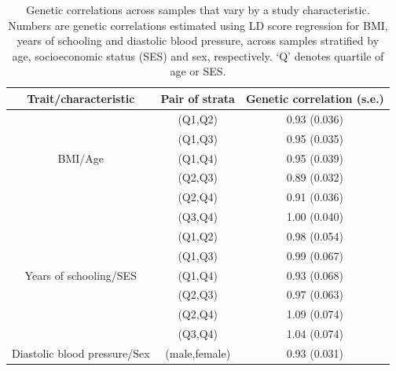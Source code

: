 \documentclass[hidelinks, 12pt]{article}
\begin{document}
\begin{table}[h]
\caption[Genetic correlations across samples that vary by a study characteristic.]{\small Genetic correlations across samples that vary by a study characteristic. Numbers are genetic correlations estimated using LD score regression for BMI, years of schooling and diastolic blood pressure, across samples stratified by age, socioeconomic status (SES) and sex, respectively. ‘Q’ denotes quartile of age or SES.}
\begin{center}
 \begin{tabular}{|c | c | c |} 
 \hline
 \textbf{Trait/characteristic} & \textbf{Pair of strata} & \textbf{Genetic correlation (s.e.)} \\ [0.5ex] 
 \hline\hline
   & (Q1,Q2) & 0.93 (0.036)  \\ 
   & (Q1,Q3) & 0.95 (0.035)  \\ 
 BMI/Age & (Q1,Q4) & 0.95 (0.039)  \\ 
   & (Q2,Q3) & 0.89 (0.032)  \\ 
   & (Q2,Q4) & 0.91 (0.036)  \\ 
   & (Q3,Q4) & 1.00 (0.040)  \\ 
 \hline\hline
  & (Q1,Q2) & 0.98 (0.054)  \\ 
  & (Q1,Q3) & 0.99 (0.067)  \\ 
 Years of schooling/SES & (Q1,Q4) & 0.93 (0.068)  \\ 
  & (Q2,Q3) & 0.97 (0.063)  \\ 
  & (Q2,Q4) & 1.09 (0.074)  \\ 
  & (Q3,Q4) & 1.04 (0.074)  \\ 
 \hline\hline
 Diastolic blood pressure/Sex & (male,female) & 0.93 (0.031)  \\ 
 \hline
 \end{tabular}
 \end{center}
\end{table}

\pagebreak
\end{document}
